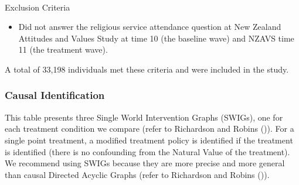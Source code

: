 \documentclass[
  single column]{article}
\makeatletter
\let\oldparagraph\paragraph
\renewcommand{\paragraph}{
    \@ifstar
      \xxxParagraphStar
      \xxxParagraphNoStar
  }
\newcommand{\xxxParagraphStar}[1]{\oldparagraph*{#1}\mbox{}}
\newcommand{\xxxParagraphNoStar}[1]{\oldparagraph{#1}\mbox{}}
\providecommand{\tightlist}{%
  \setlength{\itemsep}{0pt}\setlength{\parskip}{0pt}}\usepackage{longtable,booktabs,array}
\makeatother
\begin{document}
\paragraph{Exclusion Criteria}\label{exclusion-criteria}

\begin{itemize}
\tightlist
\item
  Did not answer the religious service attendance question at New
  Zealand Attitudes and Values Study at time 10 (the baseline wave) and
  NZAVS time 11 (the treatment wave).
\end{itemize}

A total of 33,198 individuals met these criteria and were included in
the study.

\subsubsection{Causal Identification}\label{causal-identification}

\begin{table}

\caption{\label{tbl-02}This table presents three Single World
Intervention Graphs (SWIGs), one for each treatment condition we compare
(refer to Richardson and Robins ()).
For a single point treatment, a modified treatment policy is identified
if the treatment is identified (there is no confounding from the Natural
Value of the treatment). We recommend using SWIGs because they are more
precise and more general than causal Directed Acyclic Graphs (refer to
Richardson and Robins
()).}

\centering{

\lmtptablethree

}

\end{table}%
\end{document}

